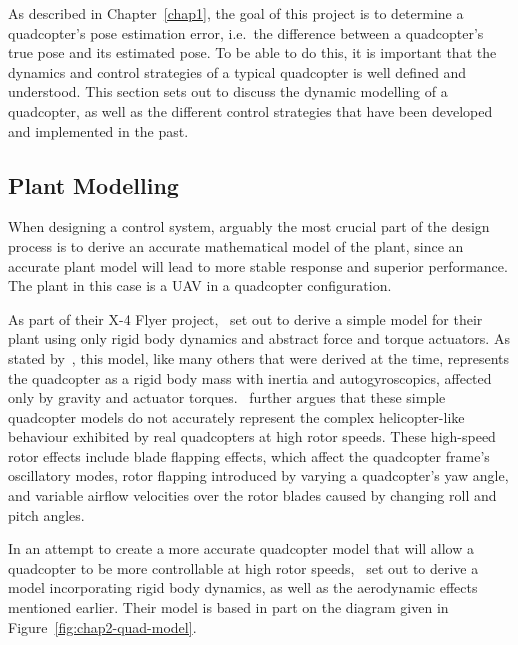 As described in Chapter~\ref{chap1}, the goal of this project is to determine a quadcopter's pose estimation error, i.e.\ the difference between a quadcopter's true pose and its estimated pose. To be able to do this, it is important that the dynamics and control strategies of a typical quadcopter is well defined and understood. This section sets out to discuss the dynamic modelling of a quadcopter, as well as the different control strategies that have been developed and implemented in the past. 

\subsection{Plant Modelling}

When designing a control system, arguably the most crucial part of the design process is to derive an accurate mathematical model of the plant, since an accurate plant model will lead to more stable response and superior performance. The plant in this case is a UAV in a quadcopter configuration. 

As part of their X-4 Flyer project,~\cite{hamel2002dynamic} set out to derive a simple model for their plant using only rigid body dynamics and abstract force and torque actuators. As stated by~\cite{Pounds2010c}, this model, like many others that were derived at the time, represents the quadcopter as a rigid body mass with inertia and autogyroscopics, affected only by gravity and actuator torques.~\citeauthor{Pounds2010c} further argues that these simple quadcopter models do not accurately represent the complex helicopter-like behaviour exhibited by real quadcopters at high rotor speeds. These high-speed rotor effects include blade flapping effects, which affect the quadcopter frame's oscillatory modes, rotor flapping introduced by varying a quadcopter's yaw angle, and variable airflow velocities over the rotor blades caused by changing roll and pitch angles.

In an attempt to create a more accurate quadcopter model that will allow a quadcopter to be more controllable at high rotor speeds,~\citeauthor{Pounds2010c} set out to derive a model incorporating rigid body dynamics, as well as the aerodynamic effects mentioned earlier. Their model is based in part on the diagram given in Figure~\ref{fig:chap2-quad-model}.

